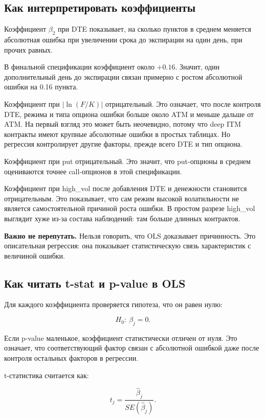 \documentclass[11pt,a4paper]{article}
\newcommand{\warn}[1]{%
  \vspace{0.15em}
  \noindent\colorbox{softred}{%
    \parbox{\dimexpr\linewidth-2\fboxsep\relax}{\textbf{Важно не перепутать.} #1}%
  }\vspace{0.2em}
}
\begin{document}
\subsection{Как интерпретировать коэффициенты}

Коэффициент $\beta_2$ при DTE показывает, на сколько пунктов в среднем меняется абсолютная ошибка при увеличении срока до экспирации на один день, при прочих равных.

В финальной спецификации коэффициент около $+0.16$. Значит, один дополнительный день до экспирации связан примерно с ростом абсолютной ошибки на 0.16 пункта.

Коэффициент при $|\ln(F/K)|$ отрицательный. Это означает, что после контроля DTE, режима и типа опциона ошибки больше около ATM и меньше дальше от ATM. На первый взгляд это может быть неочевидно, потому что deep ITM контракты имеют крупные абсолютные ошибки в простых таблицах. Но регрессия контролирует другие факторы, прежде всего DTE и тип опциона.

Коэффициент при put отрицательный. Это значит, что put-опционы в среднем оцениваются точнее call-опционов в этой спецификации.

Коэффициент при high\_vol после добавления DTE и денежности становится отрицательным. Это показывает, что сам режим высокой волатильности не является самостоятельной причиной роста ошибки. В простом разрезе high\_vol выглядит хуже из-за состава наблюдений: там больше длинных контрактов.

\warn{Нельзя говорить, что OLS доказывает причинность. Это описательная регрессия: она показывает статистическую связь характеристик с величиной ошибки.}

\subsection{Как читать t-stat и p-value в OLS}

Для каждого коэффициента проверяется гипотеза, что он равен нулю:

\begin{equation}
H_0:\ \beta_j=0.
\end{equation}

Если p-value маленькое, коэффициент статистически отличен от нуля. Это означает, что соответствующий фактор связан с абсолютной ошибкой даже после контроля остальных факторов в регрессии.

t-статистика считается как:

\begin{equation}
t_j=\frac{\hat{\beta}_j}{SE(\hat{\beta}_j)}.
\end{equation}
\end{document}

